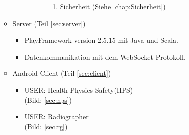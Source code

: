 \begin{itemize}
\begin{itemize}
\begin{itemize}
\begin{enumerate}
\begin{enumerate}
\begin{enumerate}
\item Sicherheit (Siehe \ref{chap:Sicherheit})
\end{enumerate}
\end{enumerate}
\end{enumerate}
\end{itemize}
\item Server (Teil \ref{sec:server})
\begin{itemize}
\item PlayFramework version 2.5.15 mit Java und Scala.
\item Datenkommunikation mit dem WebSocket-Protokoll.
\end{itemize}
\item Android-Client (Teil \ref{sec:client})
\begin{itemize}
\item USER: Health Physics Safety(HPS)\\
(Bild: \ref{sec:hps})
\item USER: Radiographer\\
(Bild: \ref{sec:rg})
\end{itemize}
\end{itemize}
\end{itemize}

